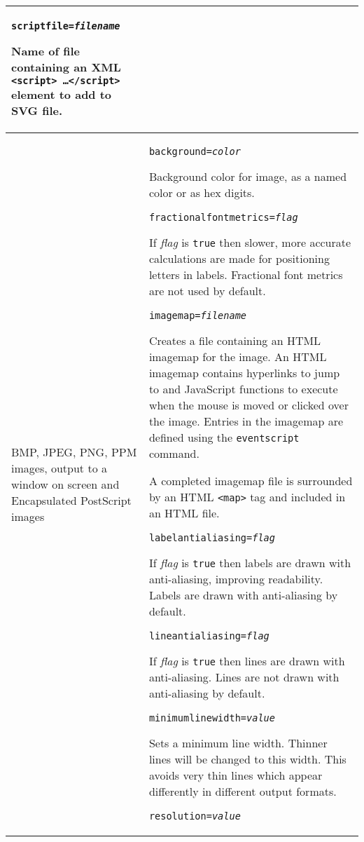\begin{longtable}{|p{4cm}|p{10cm}|}
\vspace{10pt}
\texttt{scriptfile=\textit{filename}}

Name of file containing an XML \texttt{<script> \ldots </script>}
element to add to SVG file. \\

\hline

BMP, JPEG, PNG, PPM images, output to a window on screen
and Encapsulated PostScript images &

\texttt{background=\textit{color}}

Background color for image, as a named color or as hex digits.

\vspace{10pt}
\texttt{fractionalfontmetrics=\textit{flag}}

If \textit{flag} is \texttt{true} then slower, more accurate
calculations are made for positioning letters in labels.
Fractional font metrics are not used by default.

\vspace{10pt}
\texttt{imagemap=\textit{filename}}

Creates a file containing an HTML imagemap for the image.
An HTML imagemap contains hyperlinks to jump to and JavaScript
functions to execute when the mouse is moved or clicked over the image.
Entries in the imagemap are defined using the \texttt{eventscript} command.

A completed imagemap file is surrounded by an HTML \texttt{<map>} tag
and included in an HTML file.

\vspace{10pt}
\texttt{labelantialiasing=\textit{flag}}

If \textit{flag} is \texttt{true} then
labels are drawn with anti-aliasing, improving readability.
Labels are drawn with anti-aliasing by default.

\vspace{10pt}
\texttt{lineantialiasing=\textit{flag}}

If \textit{flag} is \texttt{true} then
lines are drawn with anti-aliasing.
Lines are not drawn with anti-aliasing by default.

\vspace{10pt}
\texttt{minimumlinewidth=\textit{value}}

Sets a minimum line width.  Thinner lines will be changed to
this width.  This avoids very thin lines which appear differently
in different output formats.

\vspace{10pt}
\texttt{resolution=\textit{value}}


\end{longtable}
